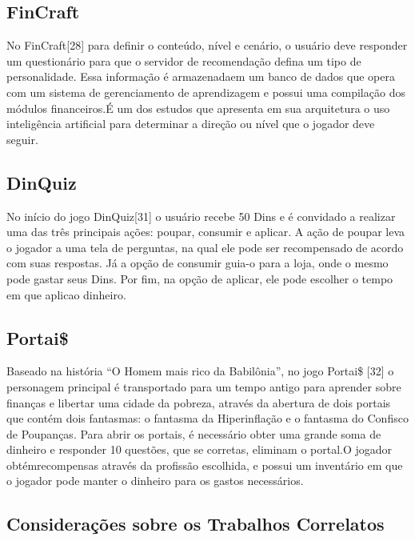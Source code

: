         \subsection{FinCraft}
            No FinCraft[28] para definir o conteúdo, nível e cenário, o usuário deve responder um questionário para que
            o servidor de recomendação defina um tipo de personalidade. Essa informação é armazenadaem um banco de dados
            que opera com um sistema de gerenciamento de aprendizagem e possui uma compilação dos módulos financeiros.É
            um dos estudos que apresenta em sua arquitetura o uso inteligência artificial para determinar a direção ou
            nível que o jogador deve seguir.

        \subsection{DinQuiz}
            No início do jogo DinQuiz[31] o usuário recebe 50 Dins e é convidado a realizar uma das três principais
            ações: poupar, consumir e aplicar. A ação de poupar leva o jogador a uma tela de perguntas, na qual ele pode
            ser recompensado de acordo com suas respostas. Já a opção de consumir guia-o para a loja, onde o mesmo pode
            gastar seus Dins. Por fim, na opção de aplicar, ele pode escolher o tempo em que aplicao dinheiro.

        \subsection{Portai\$}
            Baseado na história “O Homem mais rico da Babilônia”, no jogo Portai\$ [32] o personagem principal é
            transportado para um tempo antigo para aprender sobre finanças e libertar uma cidade da pobreza, através da
            abertura de dois portais que contém dois fantasmas: o fantasma da Hiperinflação e o fantasma do Confisco de
            Poupanças. Para abrir os portais, é necessário obter uma grande soma de dinheiro e responder 10 questões,
            que se corretas, eliminam o portal.O jogador obtémrecompensas através da profissão escolhida, e possui um
            inventário em que o jogador pode manter o dinheiro para os gastos necessários.

        \subsection{Considerações sobre os Trabalhos Correlatos}